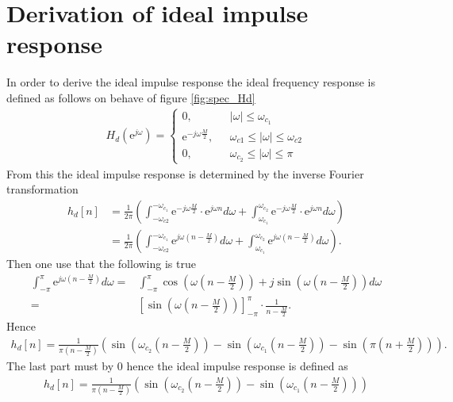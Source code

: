 \chapter{Derivation of ideal impulse response}\label{appC}
In order to derive the ideal impulse response the ideal frequency response is defined as follows on behave of figure \ref{fig:spec_Hd}
\begin{align*}
 H_d(\text{e}^{j\omega})= \begin{cases}
 0, \ \ \ & |\omega| \leq \omega_{c_1} \\
  \text{e}^{-j\omega\frac{M}{2}}, \ \ \ & \omega_{c1} \leq | \omega | \leq \omega_{c2} \\
  0, \ \ \ & \omega_{c_2} \leq |\omega| \leq \pi 
\end{cases}
\end{align*}
From this the ideal impulse response is determined by the inverse Fourier transformation 
\begin{align*}
h_d[n] &= \frac{1}{2\pi} \left(  \int_{-\omega_{c2}}^{-\omega_{c_1}} \text{e}^{-j\omega \frac{M}{2}} \cdot \text{e}^{j \omega n} d\omega + \int_{\omega_{c_1}}^{\omega_{c_2}} \text{e}^{-j\omega \frac{M}{2}} \cdot \text{e}^{j \omega n} d\omega	\right) \\
&= \frac{1}{2\pi} \left(  \int_{-\omega_{c2}}^{-\omega_{c_1}} \text{e}^{j\omega \left(n- \frac{M}{2} \right) } d\omega + \int_{\omega_{c_1}}^{\omega_{c_2}} \text{e}^{j\omega \left(n- \frac{M}{2} \right) }  d\omega \right).
\end{align*}
Then one use that the following is true
\begin{align*}
\int_{-\pi}^{\pi} \text{e}^{j\omega \left(n- \frac{M}{2} \right) }  d\omega =& \int_{-\pi}^{\pi} \cos\left( \omega \left(n-\frac{M}{2}\right)\right)+j \sin \left( \omega \left(n-\frac{M}{2}\right) \right) d\omega \\
=& \left[ \sin\left(\omega \left(n-\frac{M}{2}\right)\right) \right]_{-\pi}^{\pi} \cdot \frac{1}{n- \frac{M}{2}}.
\end{align*}
Hence
\begin{align*}
h_d[n]= \frac{1}{\pi \left(n-\frac{M}{2}\right)} \left(\sin\left(\omega_{c_2} \left(n-\frac{M}{2}\right)\right) - \sin\left(\omega_{c_1} \left(n-\frac{M}{2}\right)\right) - \sin\left( \pi\left( n + \frac{M}{2} \right) \right) \right).
\end{align*}
The last part must by $0$ hence the ideal impulse response is defined as
\begin{align*}
h_d[n]= \frac{1}{\pi \left(n-\frac{M}{2}\right)} \left(\sin\left(\omega_{c_2} \left(n-\frac{M}{2}\right)\right) - \sin\left(\omega_{c_1} \left(n-\frac{M}{2}\right)\right)\right)
\end{align*}
